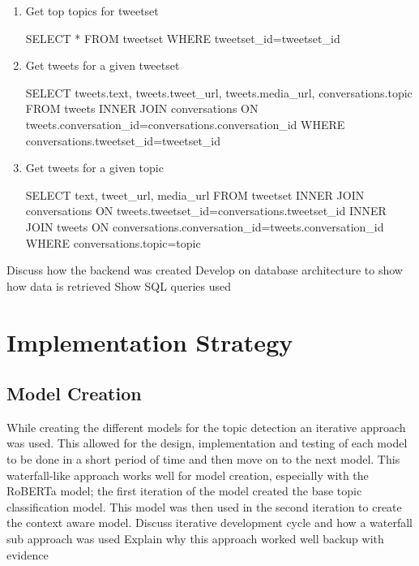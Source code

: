 \begin{enumerate}
\begin{algorithm}
\begin{algorithmic}
        \end{algorithmic}
    \end{algorithm}
    \item Get top topics for tweetset
    \begin{algorithm}
        \begin{algorithmic}
            \STATE SELECT * FROM tweetset WHERE tweetset\_id=tweetset\_id
        \end{algorithmic}
    \end{algorithm}
    \item Get tweets for a given tweetset
    \begin{algorithm}
        \begin{algorithmic}
            \STATE SELECT tweets.text, tweets.tweet\_url, tweets.media\_url, conversations.topic FROM tweets INNER JOIN conversations ON tweets.conversation\_id=conversations.conversation\_id WHERE conversations.tweetset\_id=tweetset\_id
        \end{algorithmic}
    \end{algorithm}
    \item Get tweets for a given topic
    \begin{algorithm}
        \begin{algorithmic}
            \STATE SELECT text, tweet\_url, media\_url FROM tweetset INNER JOIN conversations ON tweets.tweetset\_id=conversations.tweetset\_id INNER JOIN tweets ON conversations.conversation\_id=tweets.conversation\_id WHERE conversations.topic=topic
        \end{algorithmic}
    \end{algorithm}
\end{enumerate}
Discuss how the backend was created
Develop on database architecture to show how data is retrieved
Show SQL queries used
\section{Implementation Strategy}
\subsection{Model Creation}
While creating the different models for the topic detection an iterative approach was used. This allowed for the design, implementation and testing
of each model to be done in a short period of time and then move on to the next model. This waterfall-like approach works well for model creation,
especially with the RoBERTa model; the first iteration of the model created the base topic classification model. This model was then used
in the second iteration to create the context aware model.
Discuss iterative development cycle and how a waterfall sub approach was used
Explain why this approach worked well
backup with evidence
